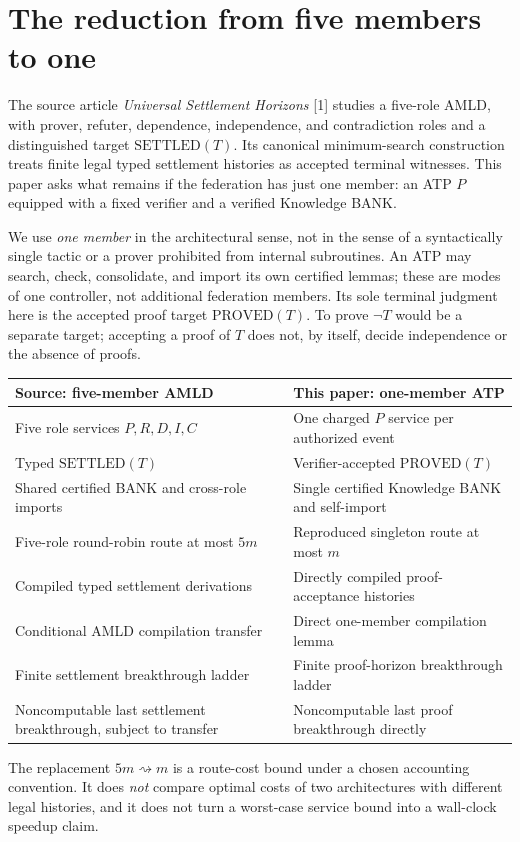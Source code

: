 \documentclass[11pt]{article}
\theoremstyle{definition}
\newcommand{\PROVED}{\mathrm{PROVED}}
\begin{document}
\section{The reduction from five members to one}
The source article \emph{Universal Settlement Horizons} [1] studies a five-role AMLD, with prover, refuter, dependence, independence, and contradiction roles and a distinguished target $\mathrm{SETTLED}(T)$. Its canonical minimum-search construction treats finite legal typed settlement histories as accepted terminal witnesses. This paper asks what remains if the federation has just one member: an ATP $P$ equipped with a fixed verifier and a verified Knowledge BANK.

We use \emph{one member} in the architectural sense, not in the sense of a syntactically single tactic or a prover prohibited from internal subroutines. An ATP may search, check, consolidate, and import its own certified lemmas; these are modes of one controller, not additional federation members. Its sole terminal judgment here is the accepted proof target $\PROVED(T)$. To prove $\neg T$ would be a separate target; accepting a proof of $T$ does not, by itself, decide independence or the absence of proofs.

\begin{center}\small
\begin{tabularx}{\linewidth}{@{}Y Y@{}}
\toprule
\textbf{Source: five-member AMLD} & \textbf{This paper: one-member ATP}\\\midrule
Five role services $P,R,D,I,C$ & One charged $P$ service per authorized event\\
Typed $\mathrm{SETTLED}(T)$ & Verifier-accepted $\PROVED(T)$\\
Shared certified BANK and cross-role imports & Single certified Knowledge BANK and self-import\\
Five-role round-robin route at most $5m$ & Reproduced singleton route at most $m$\\
Compiled typed settlement derivations & Directly compiled proof-acceptance histories\\
Conditional AMLD compilation transfer & Direct one-member compilation lemma\\
Finite settlement breakthrough ladder & Finite proof-horizon breakthrough ladder\\
Noncomputable last settlement breakthrough, subject to transfer & Noncomputable last proof breakthrough directly\\
\bottomrule
\end{tabularx}
\end{center}
The replacement $5m\rightsquigarrow m$ is a route-cost bound under a chosen accounting convention. It does \emph{not} compare optimal costs of two architectures with different legal histories, and it does not turn a worst-case service bound into a wall-clock speedup claim.
\end{document}
